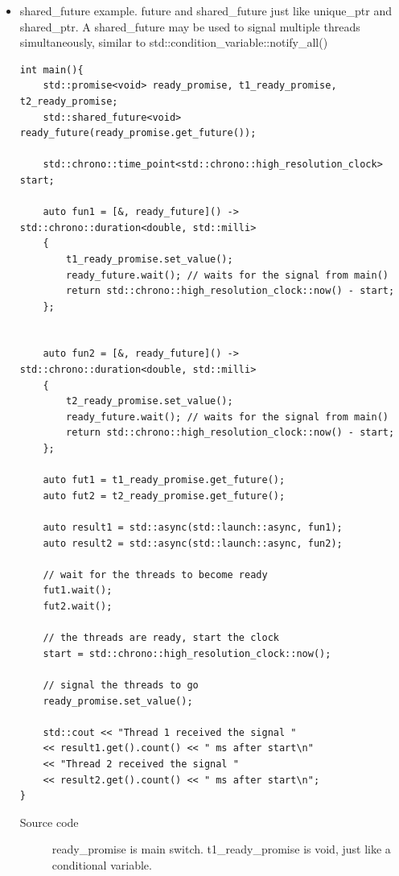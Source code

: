 \documentclass[a4paper,11pt,twoside]{book}
\begin{document}
\begin{itemize}
\item shared\_future example. future and shared\_future just like unique\_ptr and shared\_ptr. A shared\_future may be used to signal multiple threads simultaneously, similar to std::condition\_variable::notify\_all()

\begin{lstlisting}[numbers=none]
int main(){   
	std::promise<void> ready_promise, t1_ready_promise, t2_ready_promise;
	std::shared_future<void> ready_future(ready_promise.get_future());
	
	std::chrono::time_point<std::chrono::high_resolution_clock> start;
	
	auto fun1 = [&, ready_future]() -> std::chrono::duration<double, std::milli> 
	{
		t1_ready_promise.set_value();
		ready_future.wait(); // waits for the signal from main()
		return std::chrono::high_resolution_clock::now() - start;
	};
	
	
	auto fun2 = [&, ready_future]() -> std::chrono::duration<double, std::milli> 
	{
		t2_ready_promise.set_value();
		ready_future.wait(); // waits for the signal from main()
		return std::chrono::high_resolution_clock::now() - start;
	};
	
	auto fut1 = t1_ready_promise.get_future();
	auto fut2 = t2_ready_promise.get_future();
	
	auto result1 = std::async(std::launch::async, fun1);
	auto result2 = std::async(std::launch::async, fun2);
	
	// wait for the threads to become ready
	fut1.wait();
	fut2.wait();
	
	// the threads are ready, start the clock
	start = std::chrono::high_resolution_clock::now();
	
	// signal the threads to go
	ready_promise.set_value();
	
	std::cout << "Thread 1 received the signal "
	<< result1.get().count() << " ms after start\n"
	<< "Thread 2 received the signal "
	<< result2.get().count() << " ms after start\n";
}
\end{lstlisting}
\begin{description}
	\item[Source code] ready\_promise is main switch. t1\_ready\_promise is void, just like a conditional variable.
\end{description}


\end{itemize}
\end{document}
